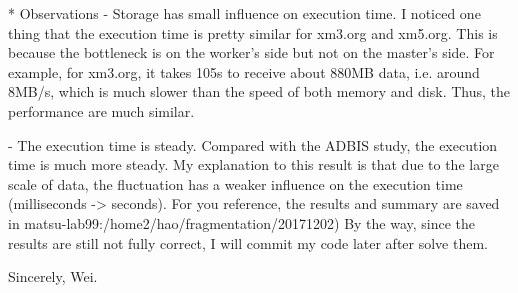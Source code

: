 * Observations
- Storage has small influence on execution time.
I noticed one thing that the execution time is pretty similar for
xm3.org and xm5.org. This is because the bottleneck is on the worker's
side but not on the master's side. For example, for xm3.org,
it takes 105s to receive about 880MB data, i.e. around 8MB/s, which
is much slower than the speed of both memory and disk. Thus,
the performance are much similar.

- The execution time is steady.
Compared with the ADBIS study, the execution time is much more
steady. My explanation to this result is that due to the large scale
of data, the fluctuation has a weaker influence on the execution
time (milliseconds -> seconds). For you reference, the results and
summary are saved in matsu-lab99:/home2/hao/fragmentation/20171202)
By the way, since the results are still not fully correct, I will
commit my code later after solve them.


Sincerely,
Wei.
